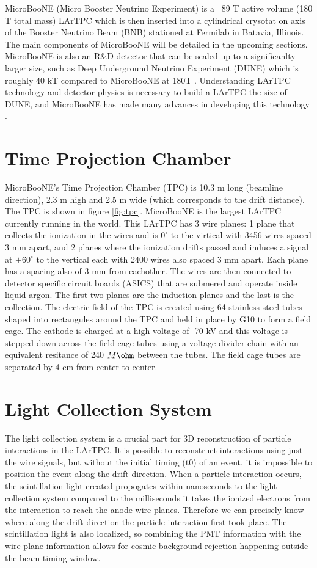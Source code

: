 MicroBooNE (Micro Booster Neutrino Experiment) is a ~89 T active volume (180 T total mass) LArTPC which is then inserted into a cylindrical crysotat on axis of the Booster Neutrino Beam (BNB) stationed at Fermilab in Batavia, Illinois. The main components of MicroBooNE will be detailed in the upcoming sections. MicroBooNE is also an R\&D detector that can be scaled up to a significanlty larger size, such as Deep Underground Neutrino Experiment (DUNE) which is roughly 40 kT compared to MicroBooNE at 180T \cite{dune}. Understanding LArTPC technology and detector physics is necessary to build a LArTPC the size of DUNE, and MicroBooNE has made many advances in developing this technology\cite{noisechar} \cite{michel}. 
\section{Time Projection Chamber}
MicroBooNE's Time Projection Chamber (TPC) is 10.3 m long (beamline direction), 2.3 m high and 2.5 m wide (which corresponds to the drift distance). The TPC is shown in figure \ref{fig:tpc}. MicroBooNE is the largest LArTPC currently running in the world\cite{microboone}. This LArTPC has 3 wire planes: 1 plane that collects the ionization in the wires and is $0^{\circ}$ to the virtical with 3456 wires spaced 3 mm apart, and 2 planes where the ionization drifts passed and induces a signal at $\pm 60^{\circ}$ to the vertical each with 2400 wires also spaced 3 mm apart. Each plane has a spacing also of 3 mm from eachother. The wires are then connected to detector specific circuit boards (ASICS) that are submered and operate inside liquid argon. The first two planes are the induction planes and the last is the collection. The electric field of the TPC is created using 64 stainless steel tubes shaped into rectangules around the TPC and held in place by G10 to form a field cage. The cathode is charged at a high voltage of -70 kV and this voltage is stepped down across the field cage tubes using a voltage divider chain with an equivalent resitance of 240 $M\ohm$ between the tubes. The field cage tubes are separated by 4 cm from center to center. 
\section{Light Collection System}
The light collection system is a crucial part for 3D reconstruction of particle interactions in the LArTPC. It is possible to reconstruct interactions using just the wire signals, but without the initial timing (t0) of an event, it is impossible to position the event along the drift direction. When a particle interaction occurs, the scintillation light created propogates within nanoseconds to the light collection system compared to the milliseconds it takes the ionized electrons from the interaction to reach the anode wire planes. Therefore we can precisely know where along the drift direction the particle interaction first took place. The scintillation light is also localized, so combining the PMT information with the wire plane information allows for cosmic background rejection happening outside the beam timing window.  

